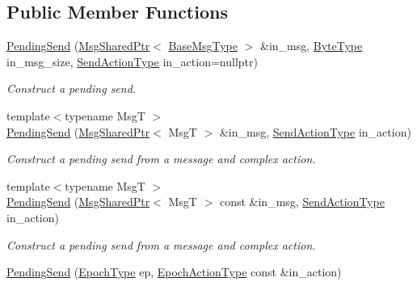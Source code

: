 \subsection*{Public Member Functions}
\begin{DoxyCompactItemize}
\item 
\hyperlink{structvt_1_1messaging_1_1_pending_send_a7ea1d6401329b5f2a1f2f4ca8d4fed40}{Pending\+Send} (\hyperlink{structvt_1_1messaging_1_1_msg_shared_ptr}{Msg\+Shared\+Ptr}$<$ \hyperlink{namespacevt_a44d0d4e144748f2b19a1cfd962f50338}{Base\+Msg\+Type} $>$ \&in\+\_\+msg, \hyperlink{namespacevt_aab8d55968084610ce3b17057981e9300}{Byte\+Type} in\+\_\+msg\+\_\+size, \hyperlink{structvt_1_1messaging_1_1_pending_send_aa13248a342d68230048cde8e0756851c}{Send\+Action\+Type} in\+\_\+action=nullptr)
\begin{DoxyCompactList}\small\item\em Construct a pending send. \end{DoxyCompactList}\item 
{\footnotesize template$<$typename MsgT $>$ }\\\hyperlink{structvt_1_1messaging_1_1_pending_send_a3409d31fed95e39a9a829f120cba8650}{Pending\+Send} (\hyperlink{structvt_1_1messaging_1_1_msg_shared_ptr}{Msg\+Shared\+Ptr}$<$ MsgT $>$ \&in\+\_\+msg, \hyperlink{structvt_1_1messaging_1_1_pending_send_aa13248a342d68230048cde8e0756851c}{Send\+Action\+Type} in\+\_\+action)
\begin{DoxyCompactList}\small\item\em Construct a pending send from a message and complex action. \end{DoxyCompactList}\item 
{\footnotesize template$<$typename MsgT $>$ }\\\hyperlink{structvt_1_1messaging_1_1_pending_send_a5ea6cde20221a525b411e4838de2ed6e}{Pending\+Send} (\hyperlink{structvt_1_1messaging_1_1_msg_shared_ptr}{Msg\+Shared\+Ptr}$<$ MsgT $>$ const \&in\+\_\+msg, \hyperlink{structvt_1_1messaging_1_1_pending_send_aa13248a342d68230048cde8e0756851c}{Send\+Action\+Type} in\+\_\+action)
\begin{DoxyCompactList}\small\item\em Construct a pending send from a message and complex action. \end{DoxyCompactList}\item 
\hyperlink{structvt_1_1messaging_1_1_pending_send_afca579cd3975846e5555808fdf7d3f4c}{Pending\+Send} (\hyperlink{namespacevt_a985a5adf291c34a3ca263b3378388236}{Epoch\+Type} ep, \hyperlink{structvt_1_1messaging_1_1_pending_send_a25131dc5a5e003dc65187edc97c23d1c}{Epoch\+Action\+Type} const \&in\+\_\+action)

\end{DoxyCompactItemize}

